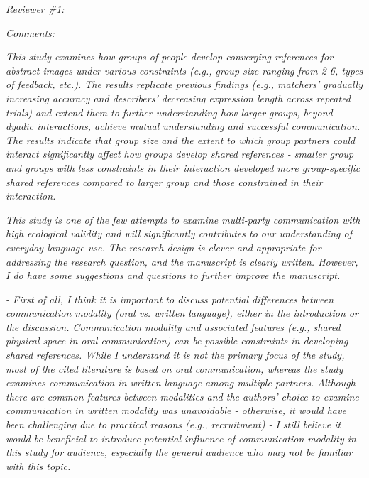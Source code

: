 \documentclass{stanfordletter}
\newcommand{\theysaid}[1]{\begin{leftbar} \noindent 
		\textsl{ #1}\end{leftbar}}
\begin{document}
\begin{letter}{}
          
          
         \theysaid{Reviewer \#1:}
         
          
          \theysaid{Comments:}
          \theysaid{This study examines how groups of people develop converging references for abstract images under various constraints (e.g., group size ranging from 2-6, types of feedback, etc.). The results replicate previous findings (e.g., matchers' gradually increasing accuracy and describers' decreasing expression length across repeated trials) and extend them to further understanding how larger groups, beyond dyadic interactions, achieve mutual understanding and successful communication. The results indicate that group size and the extent to which group partners could interact significantly affect how groups develop shared references - smaller group and groups with less constraints in their interaction developed more group-specific shared references compared to larger group and those constrained in their interaction.}
          
          \theysaid{This study is one of the few attempts to examine multi-party communication with high ecological validity and will significantly contributes to our understanding of everyday language use. The research design is clever and appropriate for addressing the research question, and the manuscript is clearly written. However, I do have some suggestions and questions to further improve the manuscript.}
          
          \theysaid{- First of all, I think it is important to discuss potential differences between communication modality (oral vs. written language), either in the introduction or the discussion. Communication modality and associated features (e.g., shared physical space in oral communication) can be possible constraints in developing shared references. While I understand it is not the primary focus of the study, most of the cited literature is based on oral communication, whereas the study examines communication in written language among multiple partners. Although there are common features between modalities and the authors' choice to examine communication in written modality was unavoidable - otherwise, it would have been challenging due to practical reasons (e.g., recruitment) - I still believe it would be beneficial to introduce potential influence of communication modality in this study for audience, especially the general audience who may not be familiar with this topic.}
          

\end{letter}
\end{document}

